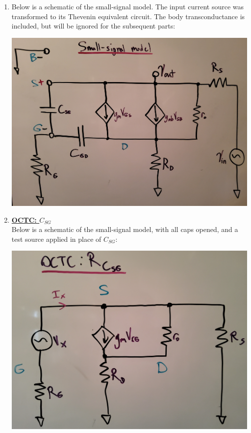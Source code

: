 \documentclass[12pt, fleqn]{article}
\begin{document}
\begin{enumerate}[label=(\alph*)]
    \item
    {
    Below is a schematic of the small-signal model.  The input current source was transformed to its Thevenin equivalent circuit.  The body transconductance is included, but will be ignored for the subsequent parts:

    \vspace{1cm}
    \includegraphics[scale=0.125, center]{p3ss.jpg}\\
    }
    \newpage
    \item
    {
    \underline{\textbf{OCTC: $C_{SG}$}}\\[0.1cm]
    Below is a schematic of the small-signal model, with all caps opened, and a test source applied in place of $C_{SG}$:

    \includegraphics[scale=0.09, center]{p3c_sg.jpg}\\
    }


\end{enumerate}
\end{document}
